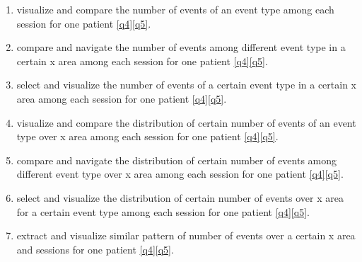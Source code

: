 \newcommand{\test}[2]{$#1 #2$}
\begin{enumerate}[label=\textbf{(\test{T2.}{\arabic*})}]
\item \label{t21} visualize and compare the number of events of an event type among each session for one patient \ref{q4}\ref{q5}.
\item \label{t22} compare and navigate the number of events among different event type in a certain x area among each session for one patient \ref{q4}\ref{q5}.
\item \label{t23} select and visualize the number of events of a certain event type in a certain x area among each session for one patient \ref{q4}\ref{q5}.
\item \label{t24} visualize and compare the distribution of certain number of events of an event type over x area among each session for one patient \ref{q4}\ref{q5}.
\item \label{t25} compare and navigate the distribution of certain number of events among different event type over x area among each session for one patient \ref{q4}\ref{q5}.
\item \label{t26} select and visualize the distribution of certain number of events over x area for a certain event type among each session for one patient \ref{q4}\ref{q5}.
\item \label{t27} extract and visualize similar pattern of number of events over a certain x area and sessions for one patient \ref{q4}\ref{q5}.
\end{enumerate}
